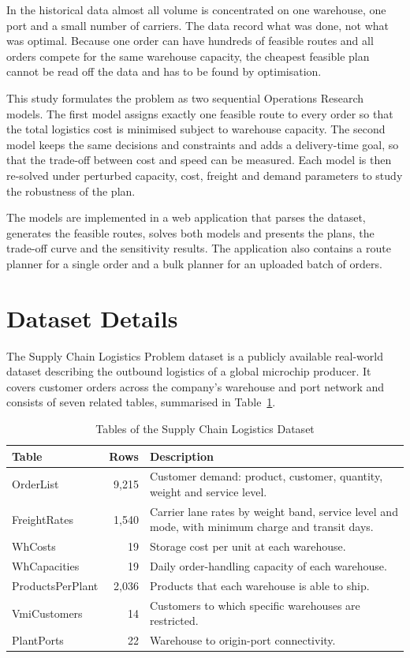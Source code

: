 \documentclass[conference]{IEEEtran}
\begin{document}
In the historical data almost all volume is concentrated on one warehouse, one port and a small number of carriers. The data record what was done, not what was optimal. Because one order can have hundreds of feasible routes and all orders compete for the same warehouse capacity, the cheapest feasible plan cannot be read off the data and has to be found by optimisation.

This study formulates the problem as two sequential Operations Research models. The first model assigns exactly one feasible route to every order so that the total logistics cost is minimised subject to warehouse capacity. The second model keeps the same decisions and constraints and adds a delivery-time goal, so that the trade-off between cost and speed can be measured. Each model is then re-solved under perturbed capacity, cost, freight and demand parameters to study the robustness of the plan.

The models are implemented in a web application that parses the dataset, generates the feasible routes, solves both models and presents the plans, the trade-off curve and the sensitivity results. The application also contains a route planner for a single order and a bulk planner for an uploaded batch of orders.

\section{Dataset Details}
The Supply Chain Logistics Problem dataset \cite{dataset,dzalbs} is a publicly available real-world dataset describing the outbound logistics of a global microchip producer. It covers customer orders across the company's warehouse and port network and consists of seven related tables, summarised in Table~\ref{tab:tables}.

\begin{table}[htbp]
\caption{Tables of the Supply Chain Logistics Dataset}
\label{tab:tables}
\centering
\renewcommand{\arraystretch}{1.2}
\begin{tabular}{|l|r|p{}|}
\hline
\textbf{Table} & \textbf{Rows} & \textbf{Description} \\
\hline
OrderList & 9,215 & Customer demand: product, customer, quantity, weight and service level. \\
\hline
FreightRates & 1,540 & Carrier lane rates by weight band, service level and mode, with minimum charge and transit days. \\
\hline
WhCosts & 19 & Storage cost per unit at each warehouse. \\
\hline
WhCapacities & 19 & Daily order-handling capacity of each warehouse. \\
\hline
ProductsPerPlant & 2,036 & Products that each warehouse is able to ship. \\
\hline
VmiCustomers & 14 & Customers to which specific warehouses are restricted. \\
\hline
PlantPorts & 22 & Warehouse to origin-port connectivity. \\
\hline
\end{tabular}
\end{table}
\end{document}
